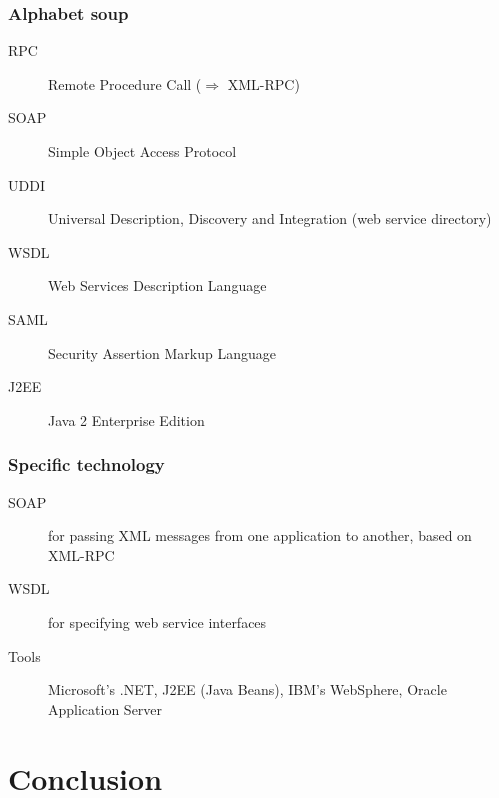 

\frame
{
	\frametitle{Alphabet soup}
		
	\begin{description}
	
		\item[RPC] Remote Procedure Call (\(\Rightarrow\) XML-RPC)

		\item[SOAP] Simple Object Access Protocol

		\item[UDDI] Universal Description, Discovery and Integration
		(web service directory)

		\item[WSDL] Web Services Description Language

		\item[SAML] Security Assertion Markup Language

		\item[J2EE] Java 2 Enterprise Edition
		
	\end{description}
}





\frame
{
	\frametitle{Specific technology}
		
	\begin{description}
	
		\item[SOAP] for passing XML messages from one application to
		another, based on XML-RPC

		\item[WSDL] for specifying web service interfaces

		\item[Tools] Microsoft's .NET, J2EE (Java Beans), IBM's
		WebSphere, Oracle Application Server
		
		
	\end{description}
}

\usebackgroundtemplate{}




\section{Conclusion}


